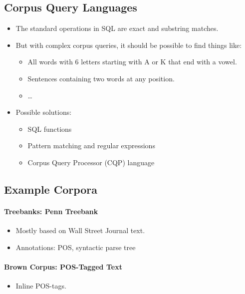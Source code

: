         \subsection{Corpus Query Languages} %
            \begin{itemize}
            	\item The standard operations in SQL are exact and substring matches.
            	\item But with complex corpus queries, it should be possible to find things like:
            		\begin{itemize}
            			\item All words with 6 letters starting with A or K that end with a vowel.
            			\item Sentences containing two words at any position.
            			\item \dots
            		\end{itemize}
            	\item Possible solutions:
            		\begin{itemize}
            			\item SQL functions
            			\item Pattern matching and regular expressions
            			\item Corpus Query Processor (CQP) language
            		\end{itemize}
            \end{itemize}

        \subsection{Example Corpora} %
            \paragraph{Treebanks: Penn Treebank} %
            	\begin{itemize}
            		\item Mostly based on Wall Street Journal text.
            		\item Annotations: POS, syntactic parse tree
            	\end{itemize}
            
            \paragraph{Brown Corpus: POS-Tagged Text} %
            	\begin{itemize}
            		\item Inline POS-tags.
            	\end{itemize}

